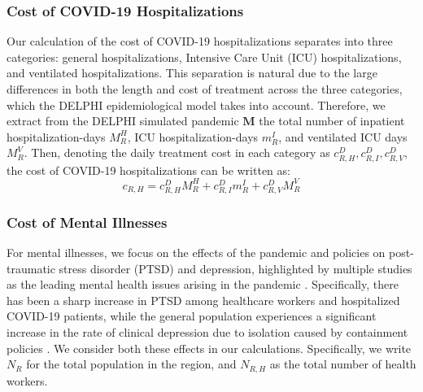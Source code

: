 \documentclass[msom,blindrev]{informs3} %
\begin{document}
\subsubsection*{Cost of COVID-19 Hospitalizations}
Our calculation of the cost of COVID-19 hospitalizations separates into three categories: general hospitalizations, Intensive Care Unit (ICU) hospitalizations, and ventilated hospitalizations. This separation is natural due to the large differences in both the length and cost of treatment across the three categories, which the DELPHI epidemiological model takes into account. Therefore, we extract from the DELPHI simulated pandemic $\bm{M}$ the total number of inpatient hospitalization-days $M^H_R$, ICU hospitalization-days $m^I_R$, and ventilated ICU days $M^V_R$. Then, denoting the daily treatment cost in each category as $c^D_{R,H}, c^D_{R,I}, c^D_{R,V}$, the cost of COVID-19 hospitalizations can be written as:
\begin{equation}
    c_{R,H}=c^D_{R,H}M^H_R+c^D_{R,I} m^I_R+c^D_{R,V} M^V_R
\end{equation}

\subsubsection*{Cost of Mental Illnesses}
For mental illnesses, we focus on the effects of the pandemic and policies on post-traumatic stress disorder (PTSD) and depression, highlighted by multiple studies as the leading mental health issues arising in the pandemic . Specifically, there has been a sharp increase in PTSD among healthcare workers and hospitalized COVID-19 patients, while the general population experiences a significant increase in the rate of clinical depression due to isolation caused by containment policies . We consider both these effects in our calculations. Specifically, we write $N_R$ for the total population in the region, and $N_{R,H}$ as the total number of health workers.
\end{document}
